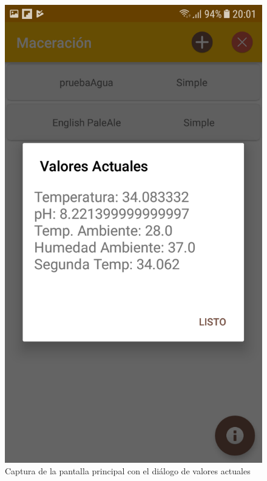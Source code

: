                 \begin{figure}[h]
                    \centering
                    \includegraphics[scale=0.2]{software/ScreenCapture/ShowCurrentValues.jpg}
                    \caption{Captura de la pantalla principal con el diálogo de valores actuales}
                    \label{fig:CapturaShowCurrentValues}
                \end{figure}
                
                
